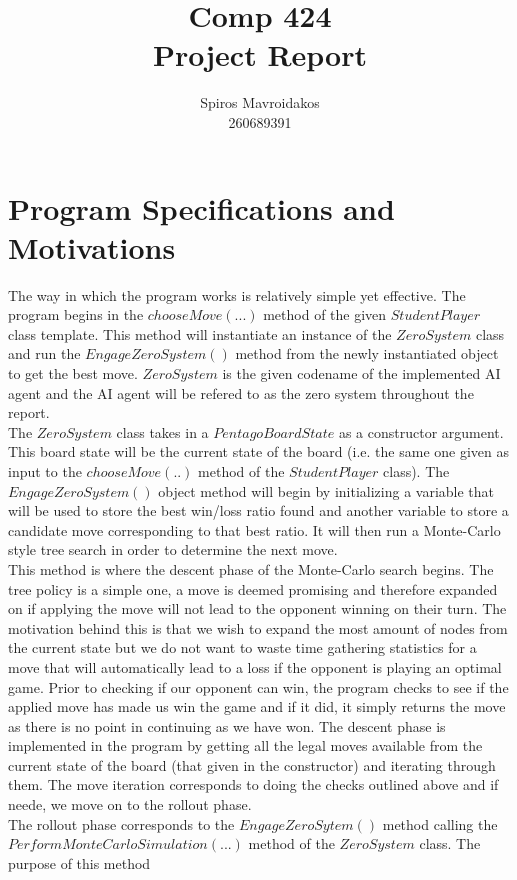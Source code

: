 \documentclass[12pt]{article} %
\title{Comp 424 \\ Project Report}
\author{Spiros Mavroidakos \\ 260689391}
\begin{document}
 
\maketitle
\newpage
\section{Program Specifications and Motivations} 
The way in which the program works is relatively simple yet effective. The program begins in the $chooseMove(...)$ method of the given $StudentPlayer$ class template.
This method will instantiate an instance of the $ZeroSystem$ class and run the $EngageZeroSystem()$ method from the newly instantiated object to get the best move. 
$ZeroSystem$ is the given codename of the implemented AI agent and the AI agent will be refered to as the zero system throughout the report. \\
The $ZeroSystem$ class takes in a $PentagoBoardState$ as a constructor argument. This board state will be the current state of the board (i.e. the same one given as 
input to the $chooseMove(..)$ method of the $StudentPlayer$ class). The $EngageZeroSystem()$ object method will begin by initializing a variable that will be used to store the best win/loss 
ratio found and another variable to store a candidate move corresponding to that best ratio. It will then run a Monte-Carlo style tree search in order
to determine the next move. 
\\This method is where the descent phase of the Monte-Carlo search begins. The tree policy is a simple one, a move is deemed promising and therefore 
expanded on if applying the move will not lead to the opponent winning on their turn. The motivation behind this is that we wish to expand the most amount of nodes from the current state
but we do not want to waste time gathering statistics for a move that will automatically lead to a loss if the opponent is playing an optimal game. Prior to checking if our 
opponent can win, the program checks to see if the applied move has made us win the game and if it did, it simply returns the move as there is no point in continuing as we 
have won. The descent phase is implemented in the program by getting all the legal moves available from the current state of the board (that given in the constructor) and 
iterating through them. The move iteration corresponds to doing the checks outlined above and if neede, we move on to the rollout phase.
\\The rollout phase corresponds to the $EngageZeroSytem()$ method calling the \\$PerformMonteCarloSimulation(...)$ method of the $ZeroSystem$ class. The purpose of this method
\end{document}
